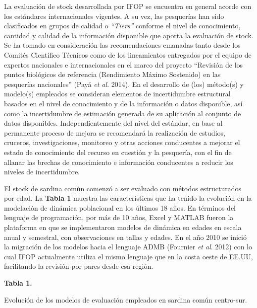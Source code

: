\documentclass[
  spanish,
]{article}
\begin{document}
La evaluación de stock desarrollada por IFOP se encuentra en general
acorde con los estándares internacionales vigentes. A su vez, las
pesquerías han sido clasificados en grupos de calidad o \emph{``Tiers''}
conforme el nivel de conocimiento, cantidad y calidad de la información
disponible que aporta la evaluación de stock. Se ha tomado en
consideración las recomendaciones emanadas tanto desde los Comités
Científico Técnicos como de los lineamientos entregados por el equipo de
expertos nacionales e internacionales en el marco del proyecto
``Revisión de los puntos biológicos de referencia (Rendimiento Máximo
Sostenido) en las pesquerías nacionales'' (Payá \emph{et al}. 2014). En
el desarrollo de (los) método(s) y modelo(s) empleados se consideran
elementos de incertidumbre estructural basados en el nivel de
conocimiento y de la información o datos disponible, así como la
incertidumbre de estimación generada de su aplicación al conjunto de
datos disponibles. Independientemente del nivel del estándar, en base al
permanente proceso de mejora se recomendará la realización de estudios,
cruceros, investigaciones, monitoreo y otras acciones conducentes a
mejorar el estado de conocimiento del recurso en cuestión y la
pesquería, con el fin de allanar las brechas de conocimiento e
información conducentes a reducir los niveles de incertidumbre.

El stock de sardina común comenzó a ser evaluado con métodos
estructurados por edad. La \textbf{Tabla 1} muestra las características
que ha tenido la evolución en la modelación de dinámica poblacional en
los últimos 18 años. En términos del lenguaje de programación, por más
de 10 años, Excel y MATLAB fueron la plataforma en que se implementaron
modelos de dinámica en edades en escala anual y semestral, con
observaciones en tallas y edades. En el año 2010 se inició la migración
de los modelos hacia el lenguaje ADMB (Fournier \emph{et al}. 2012) con
lo cual IFOP actualmente utiliza el mismo lenguaje que en la costa oeste
de EE.UU, facilitando la revisión por pares desde esa región.

\small
\begin{center} 
\textbf{Tabla 1.}
\end{center}
\begin{center} 
\vspace{-0.2cm} Evolución de los modelos de evaluación empleados en sardina común centro-sur.
\end{center}
\vspace{-0.2cm}
\end{document}
